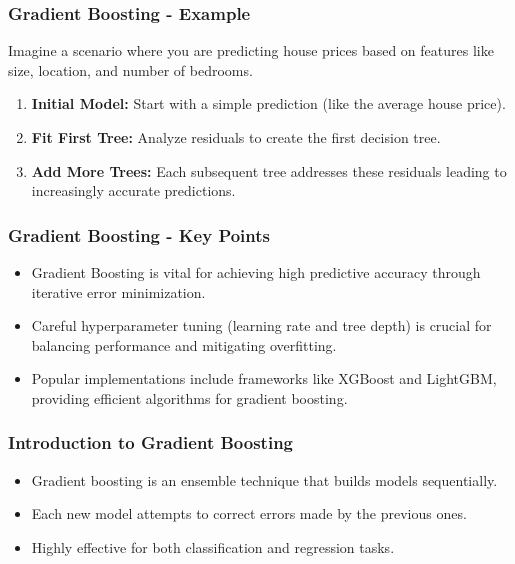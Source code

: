 \documentclass[aspectratio=169]{beamer}
\begin{document}
\begin{frame}[fragile]
    \frametitle{Gradient Boosting - Example}
    
    Imagine a scenario where you are predicting house prices based on features like size, location, and number of bedrooms. 
    
    \begin{enumerate}
        \item \textbf{Initial Model:} Start with a simple prediction (like the average house price).
        \item \textbf{Fit First Tree:} Analyze residuals to create the first decision tree.
        \item \textbf{Add More Trees:} Each subsequent tree addresses these residuals leading to increasingly accurate predictions.
    \end{enumerate}
\end{frame}

\begin{frame}[fragile]
    \frametitle{Gradient Boosting - Key Points}
    
    \begin{itemize}
        \item Gradient Boosting is vital for achieving high predictive accuracy through iterative error minimization.
        \item Careful hyperparameter tuning (learning rate and tree depth) is crucial for balancing performance and mitigating overfitting.
        \item Popular implementations include frameworks like XGBoost and LightGBM, providing efficient algorithms for gradient boosting.
    \end{itemize}
\end{frame}

\begin{frame}
    \titlepage
\end{frame}

\begin{frame}
    \frametitle{Introduction to Gradient Boosting}
    \begin{itemize}
        \item Gradient boosting is an ensemble technique that builds models sequentially.
        \item Each new model attempts to correct errors made by the previous ones.
        \item Highly effective for both classification and regression tasks.
    \end{itemize}
\end{frame}
\end{document}
